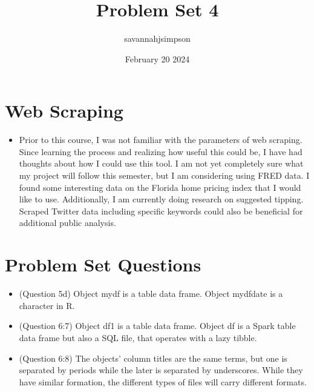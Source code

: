 \documentclass{article}
\title{Problem Set 4}
\author{savannahjsimpson }
\date{February 20 2024}
\begin{document}
\maketitle

\section{Web Scraping}
\begin{itemize}
\item Prior to this course, I was not familiar with the parameters of web scraping. Since learning the process and realizing how useful this could be, I have had thoughts about how I could use this tool. I am not yet completely sure what my project will follow this semester, but I am considering using FRED data. I found some interesting data on the Florida home pricing index that I would like to use. Additionally, I am currently doing research on suggested tipping. Scraped Twitter data including specific keywords could also be beneficial for additional public analysis.  
\end{itemize}

\section{Problem Set Questions}
\begin{itemize}
\item (Question 5d) Object mydf is a table data frame. Object mydfdate is a character in R. 
\item (Question 6:7) Object df1 is a table data frame. Object df is a Spark table data frame but also a SQL file, that operates with a lazy tibble. 
\item (Question 6:8) The objects' column titles are the same terms, but one is separated by periods while the later is separated by underscores. While they have similar formation, the different types of files will carry different formats. 
\end{itemize}
\end{document}
